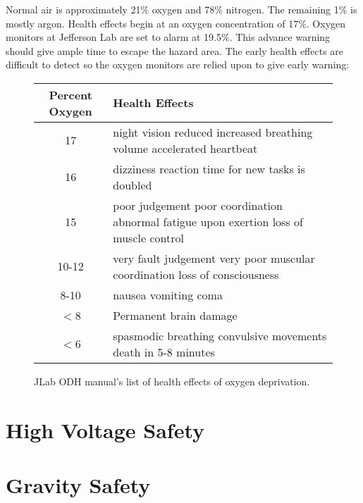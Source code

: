 Normal air is approximately 21\% oxygen and 78\% nitrogen. The remaining 1\% is mostly argon. Health effects begin at an oxygen concentration of 17\%. Oxygen monitors at Jefferson Lab are set to alarm at 19.5\%. This advance warning should give ample time to escape the hazard area.  The early health effects are difficult to detect so the oxygen monitors are relied upon to give early warning:

\begin{figure}
\centering
\begin{tabular}{|c|p{6cm}|}
 \hline
Percent Oxygen & Health Effects \\
\hline
17 & night vision reduced \newline increased breathing volume \newline accelerated heartbeat \\
\hline
16 & dizziness \newline reaction time for new tasks is doubled\\
\hline
15 & poor judgement \newline poor coordination \newline abnormal fatigue upon exertion \newline loss of muscle control\\
\hline
10-12 & very fault judgement \newline very poor muscular coordination \newline loss of consciousness\\
\hline
8-10& nausea \newline vomiting \newline coma\\
\hline
$<$8 & Permanent brain damage \\
\hline
$<$6 & spasmodic breathing \newline convulsive movements \newline death in 5-8 minutes \\
\hline
\end{tabular} 
\caption{JLab ODH manual's list of health effects of oxygen deprivation.}
\label{fig:jlabodh}
\end{figure}

\section{High Voltage Safety}
\section{Gravity Safety}
